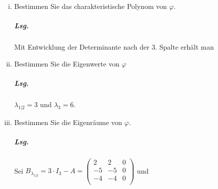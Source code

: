 \documentclass{scrreprt}
\begin{document}
\begin{enumerate}[(i)]
\item Bestimmen Sie das charakteristische Polynom von $\varphi$.

  \subparagraph{Lsg.} Mit Entwicklung der Determinante nach der 3. Spalte
  erhält man

\item Bestimmen Sie die Eigenwerte von $\varphi$

  \subparagraph{Lsg.} $\lambda_{1|2} = 3$ und $\lambda_3 = 6$.

\item Bestimmen Sie die Eigenräume von $\varphi$.

  \subparagraph{Lsg.} Sei $B_{\lambda_{1|2}} = 3 \cdot I_3 - A = \begin{pmatrix}
    2 & 2 & 0 \\
    -5 & -5 & 0 \\
    -4 & -4 & 0 \\
  \end{pmatrix}$ und


\end{enumerate}
\end{document}
